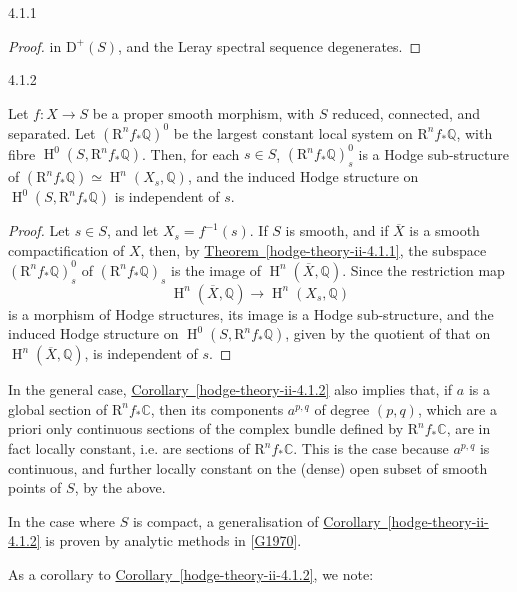\begin{theorem}{4.1.1}
\begin{proof}
      in \(\mathrm {D}^+(S)\), and the Leray spectral sequence degenerates.\end{proof}\end{theorem}\begin{corollary}{4.1.2}\label{hodge-theory-ii-4.1.2}\skipsinglepar\par{}Let \(f\colon  X\to  S\) be a proper smooth morphism, with \(S\) reduced, connected, and separated.
    Let \((\mathrm {R}^n f_*\mathbb {Q})^0\) be the largest constant local system on \(\mathrm {R}^n f_*\mathbb {Q}\), with fibre \(\operatorname {H}^0(S,\mathrm {R}^n f_*\mathbb {Q})\).
    Then, for each \(s\in  S\), \((\mathrm {R}^n f_*\mathbb {Q})_s^0\) is a Hodge sub-structure of \((\mathrm {R}^n f_*\mathbb {Q})\simeq \operatorname {H}^n(X_s,\mathbb {Q})\), and the induced Hodge structure on \(\operatorname {H}^0(S,\mathrm {R}^n f_*\mathbb {Q})\) is independent of \(s\).\begin{proof}\par{}Let \(s\in  S\), and let \(X_s=f^{-1}(s)\).
      If \(S\) is smooth, and if \(\overline {X}\) is a smooth compactification of \(X\), then, by \hyperref[hodge-theory-ii-4.1.1]{Theorem~\ref*{hodge-theory-ii-4.1.1}}, the subspace \((\mathrm {R}^n f_*\mathbb {Q})_s^0\) of \((\mathrm {R}^n f_*\mathbb {Q})_s\) is the image of \(\operatorname {H}^n(\overline {X},\mathbb {Q})\).
      Since the restriction map
      \[         \operatorname {H}^n(\overline {X},\mathbb {Q}) \to  \operatorname {H}^n(X_s,\mathbb {Q})       \]
      is a morphism of Hodge structures, its image is a Hodge sub-structure, and the induced Hodge structure on \(\operatorname {H}^0(S,\mathrm {R}^n f_*\mathbb {Q})\), given by the quotient of that on \(\operatorname {H}^n(\overline {X},\mathbb {Q})\), is independent of \(s\).\end{proof}\end{corollary}\par{}In the general case, \hyperref[hodge-theory-ii-4.1.2]{Corollary~\ref*{hodge-theory-ii-4.1.2}} also implies that, if \(a\) is a global section of \(\mathrm {R}^n f_*\mathbb {C}\), then its components \(a^{p,q}\) of degree \((p,q)\), which are a priori only continuous sections of the complex bundle defined by \(\mathrm {R}^n f_*\mathbb {C}\), are in fact locally constant, i.e. are sections of \(\mathrm {R}^n f_*\mathbb {C}\).
  This is the case because \(a^{p,q}\) is continuous, and further locally constant on the (dense) open subset of smooth points of \(S\), by the above.\label{hodge-theory-ii-4.1.3}\par{}In the case where \(S\) is compact, a generalisation of \hyperref[hodge-theory-ii-4.1.2]{Corollary~\ref*{hodge-theory-ii-4.1.2}} is proven by analytic methods in [\hyperref[G1970]{G1970}].\par{}As a corollary to \hyperref[hodge-theory-ii-4.1.2]{Corollary~\ref*{hodge-theory-ii-4.1.2}}, we note:

